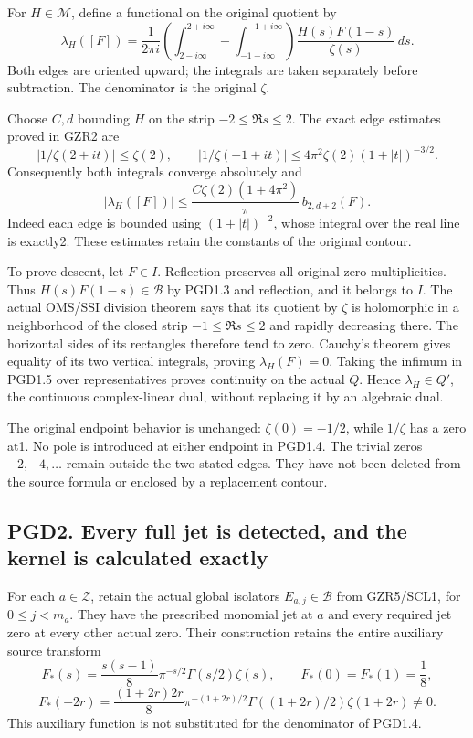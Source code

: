 For \(H\in\mathcal M\), define a functional on the original quotient by
\[
\lambda_H([F])=\frac1{2\pi i}
\left(\int_{2-i\infty}^{2+i\infty}-\int_{-1-i\infty}^{-1+i\infty}\right)
\frac{H(s)F(1-s)}{\zeta(s)}\,ds.
\tag{PGD1.4}
\] Both edges are oriented upward; the integrals are taken separately
before subtraction. The denominator is the original \(\zeta\).

Choose \(C,d\) bounding \(H\) on the strip \(-2\le\Re s\le2\). The exact
edge estimates proved in GZR2 are \[
|1/\zeta(2+it)|\le\zeta(2),\qquad
|1/\zeta(-1+it)|\le4\pi^2\zeta(2)(1+|t|)^{-3/2}.
\] Consequently both integrals converge absolutely and \[
|\lambda_H([F])|\le
\frac{C\zeta(2)(1+4\pi^2)}{\pi}\,b_{2,d+2}(F).
\tag{PGD1.5}
\] Indeed each edge is bounded using \((1+|t|)^{-2}\), whose integral
over the real line is exactly2. These estimates retain the constants of
the original contour.

To prove descent, let \(F\in I\). Reflection preserves all original zero
multiplicities. Thus \(H(s)F(1-s)\in\mathcal B\) by PGD1.3 and
reflection, and it belongs to \(I\). The actual OMS/SSI division theorem
says that its quotient by \(\zeta\) is holomorphic in a neighborhood of
the closed strip \(-1\le\Re s\le2\) and rapidly decreasing there. The
horizontal sides of its rectangles therefore tend to zero. Cauchy's
theorem gives equality of its two vertical integrals, proving
\(\lambda_H(F)=0\). Taking the infimum in PGD1.5 over representatives
proves continuity on the actual \(Q\). Hence \(\lambda_H\in Q'\), the
continuous complex-linear dual, without replacing it by an algebraic
dual.

The original endpoint behavior is unchanged: \(\zeta(0)=-1/2\), while
\(1/\zeta\) has a zero at1. No pole is introduced at either endpoint in
PGD1.4. The trivial zeros \(-2,-4,\ldots\) remain outside the two stated
edges. They have not been deleted from the source formula or enclosed by
a replacement contour.

\subsection{PGD2. Every full jet is detected, and the kernel is
calculated
exactly}\label{pgd2.-every-full-jet-is-detected-and-the-kernel-is-calculated-exactly}

For each \(a\in\mathscr Z\), retain the actual global isolators
\(E_{a,j}\in\mathcal B\) from GZR5/SCL1, for \(0\le j<m_a\). They have
the prescribed monomial jet at \(a\) and every required jet zero at
every other actual zero. Their construction retains the entire auxiliary
source transform \[
F_*(s)=\frac{s(s-1)}8\pi^{-s/2}\Gamma(s/2)\zeta(s),\qquad
F_*(0)=F_*(1)=\frac18,
\] \[
F_*(-2r)=\frac{(1+2r)2r}{8}\pi^{-(1+2r)/2}
\Gamma((1+2r)/2)\zeta(1+2r)\ne0.
\tag{PGD2.1}
\] This auxiliary function is not substituted for the denominator of
PGD1.4.

